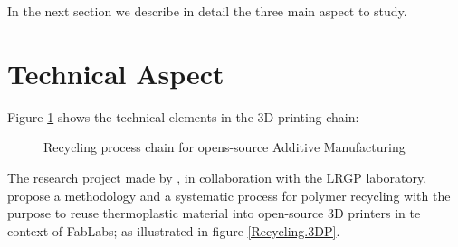 In the next section we describe in detail the three main aspect to study.

\section{Technical Aspect}

Figure \ref{3D.Printing.Chain} shows the technical elements in the 3D printing chain:

\begin{figure}[H]
	\centering
	\caption{Recycling process chain for opens-source Additive Manufacturing}
	\label{3D.Printing.Chain}
\end{figure}

The research project made by \textcite{CruzSanchez2017, CruzSanchez2014, Cruz2012}, in collaboration with the LRGP laboratory,  propose a methodology and a systematic process for polymer recycling with the purpose to reuse thermoplastic material into open-source 3D printers in te context of FabLabs; as illustrated in figure \ref{Recycling.3DP}.


